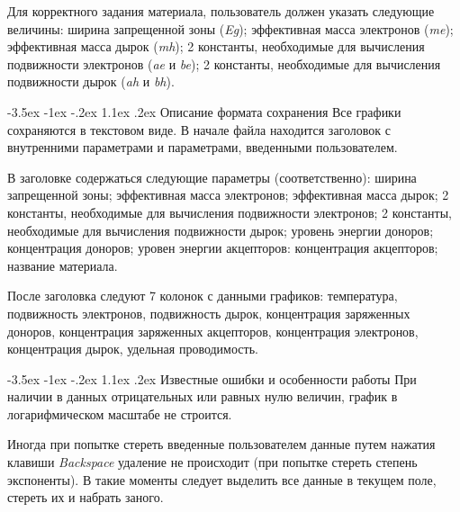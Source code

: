\documentclass[12pt,a4paper]{extarticle}
\makeatletter
\renewcommand\section{\@startsection{section}{1}{\z@}%
	{-3.5ex \@plus -1ex \@minus -.2ex}%
	{1.1ex \@plus.2ex}%
	{\normalfont\normalfont\bfseries}}%
\makeatother
\begin{document}
Для корректного задания материала, пользователь должен указать следующие величины: ширина запрещенной зоны (\textit{Eg}); эффективная масса электронов (\textit{me}); эффективная масса дырок (\textit{mh}); 2 константы, необходимые для вычисления подвижности электронов (\textit{ae} и \textit{be}); 2 константы, необходимые для вычисления подвижности дырок (\textit{ah} и \textit{bh}).

\section{Описание формата сохранения}
Все графики сохраняются в текстовом виде. В начале файла находится заголовок с внутренними параметрами и параметрами, введенными пользователем.

В заголовке содержаться следующие параметры (соответственно): ширина запрещенной зоны; эффективная масса электронов; эффективная масса дырок; 2 константы, необходимые для вычисления подвижности электронов; 2 константы, необходимые для вычисления подвижности дырок; уровень энергии доноров; концентрация доноров; уровен энергии акцепторов: концентрация акцепторов; название материала.

После заголовка следуют 7 колонок с данными графиков: температура, подвижность электронов, подвижность дырок, концентрация заряженных доноров, концентрация заряженных акцепторов, концентрация электронов, концентрация дырок, удельная проводимость.

\section{Известные ошибки и особенности работы}
При наличии в данных отрицательных или равных нулю величин, график в логарифмическом масштабе не строится.

Иногда при попытке стереть введенные пользователем данные путем нажатия клавиши \textit{Backspace} удаление не происходит (при попытке стереть степень экспоненты). В такие моменты следует выделить все данные в текущем поле, стереть их и набрать заного.
\end{document}
